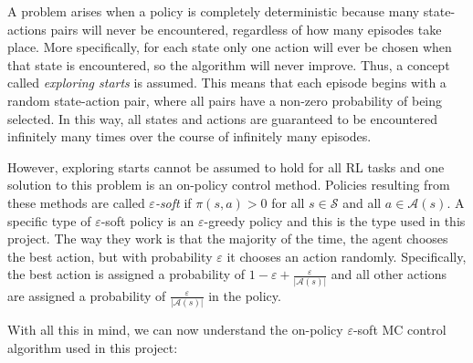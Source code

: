 \documentclass[11pt,a4paper]{report}
\begin{document}
A problem arises when a policy is completely deterministic because many state-actions pairs will never be encountered, regardless of how many episodes take place. More specifically, for each state only one action will ever be chosen when that state is encountered, so the algorithm will never improve. Thus, a concept called \emph{exploring starts} is assumed. This means that each episode begins with a random state-action pair, where all pairs have a non-zero probability of being selected. In this way, all states and actions are guaranteed to be encountered infinitely many times over the course of infinitely many episodes.

However, exploring starts cannot be assumed to hold for all RL tasks and one solution to this problem is an on-policy control method. Policies resulting from these methods are called \emph{$\varepsilon$-soft} if $\pi(s,a) > 0$ for all $s \in \mathcal{S}$ and all $a \in \mathcal{A}(s)$. A specific type of $\varepsilon$-soft policy is an $\varepsilon$-greedy policy and this is the type used in this project. The way they work is that the majority of the time, the agent chooses the best action, but with probability $\varepsilon$ it chooses an action randomly. Specifically, the best action is assigned a probability of $1 - \varepsilon + \frac{\varepsilon}{|\mathcal{A}(s)|}$ and all other actions are assigned a probability of $\frac{\varepsilon}{|\mathcal{A}(s)|}$ in the policy.

With all this in mind, we can now understand the on-policy $\varepsilon$-soft MC control algorithm used in this project:
\end{document}
